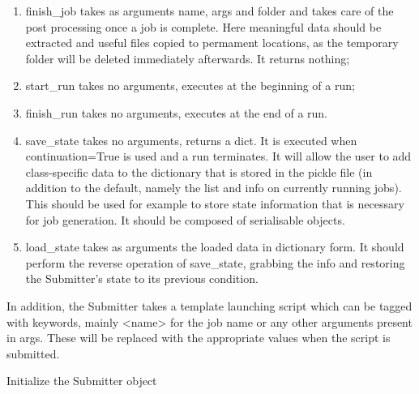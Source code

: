 \documentclass[letterpaper,10pt,english]{sphinxmanual}
\begin{document}
\begin{fulllineitems}
\begin{enumerate}
\item {} 
finish\_job takes as arguments name, args and folder and takes care of
the post processing once a job is complete. Here meaningful data should
be extracted and useful files copied to permament locations, as the
temporary folder will be deleted immediately afterwards. It returns
nothing;

\item {} 
start\_run takes no arguments, executes at the beginning of a run;

\item {} 
finish\_run takes no arguments, executes at the end of a run.

\item {} 
save\_state takes no arguments, returns a dict. It is executed when
continuation=True is used and a run terminates. It will allow the user
to add class-specific data to the dictionary that is stored in the 
pickle file (in addition to the default, namely the list and info on
currently running jobs). This should be used for example to store state 
information that is necessary for job generation. It should be composed
of serialisable objects.

\item {} 
load\_state takes as arguments the loaded data in dictionary form. It
should perform the reverse operation of save\_state, grabbing the info
and restoring the Submitter's state to its previous condition.

\end{enumerate}

In addition, the Submitter takes a template launching script which can
be tagged with keywords, mainly \textless{}name\textgreater{} for the job name or any other
arguments present in args. These will be replaced with the appropriate
values when the script is submitted.

Initialize the Submitter object


\end{fulllineitems}
\end{document}
